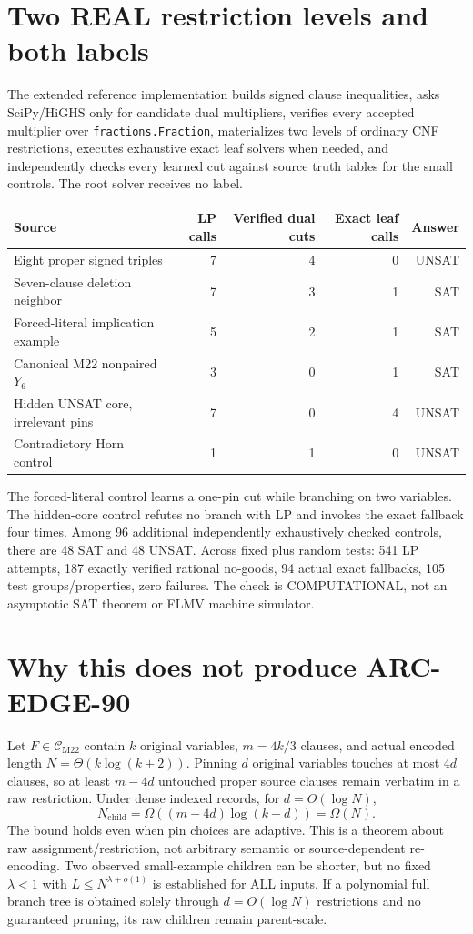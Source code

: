 \documentclass[11pt]{article}
\begin{document}
\section{Two REAL restriction levels and both labels}
The extended reference implementation builds signed clause inequalities, asks SciPy/HiGHS only for candidate dual multipliers, verifies every accepted multiplier over \texttt{fractions.Fraction}, materializes two levels of ordinary CNF restrictions, executes exhaustive exact leaf solvers when needed, and independently checks every learned cut against source truth tables for the small controls. The root solver receives no label.
\begin{center}
\begin{tabular}{lrrrr}
\toprule
Source & LP calls & Verified dual cuts & Exact leaf calls & Answer\\\midrule
Eight proper signed triples &7&4&0&UNSAT\\
Seven-clause deletion neighbor &7&3&1&SAT\\
Forced-literal implication example &5&2&1&SAT\\
Canonical M22 nonpaired $Y_6$ &3&0&1&SAT\\
Hidden UNSAT core, irrelevant pins &7&0&4&UNSAT\\
Contradictory Horn control &1&1&0&UNSAT\\\bottomrule
\end{tabular}
\end{center}
The forced-literal control learns a one-pin cut while branching on two variables. The hidden-core control refutes no branch with LP and invokes the exact fallback four times. Among 96 additional independently exhaustively checked controls, there are 48 SAT and 48 UNSAT. Across fixed plus random tests: 541 LP attempts, 187 exactly verified rational no-goods, 94 actual exact fallbacks, 105 test groups/properties, zero failures. The check is COMPUTATIONAL, not an asymptotic SAT theorem or FLMV machine simulator.

\section{Why this does not produce ARC-EDGE-90}
Let $F\in\mathcal C_{\mathrm{M22}}$ contain $k$ original variables, $m=4k/3$ clauses, and actual encoded length $N=\Theta(k\log(k+2))$. Pinning $d$ original variables touches at most $4d$ clauses, so at least $m-4d$ untouched proper source clauses remain verbatim in a raw restriction. Under dense indexed records, for $d=O(\log N)$,
\[
N_{\mathrm{child}}=\Omega((m-4d)\log(k-d))=\Omega(N).
\]
The bound holds even when pin choices are adaptive. This is a theorem about raw assignment/restriction, not arbitrary semantic or source-dependent re-encoding. Two observed small-example children can be shorter, but no fixed $\lambda<1$ with $L\le N^{\lambda+o(1)}$ is established for ALL inputs. If a polynomial full branch tree is obtained solely through $d=O(\log N)$ restrictions and no guaranteed pruning, its raw children remain parent-scale.
\end{document}
